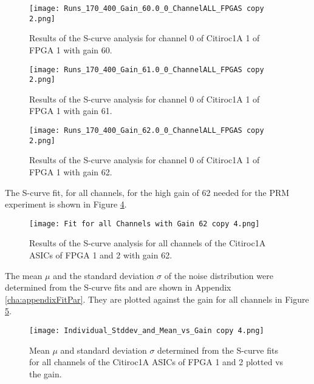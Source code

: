     \begin{figure}[H]
        \centering
        \texttt{[image: Runs\_170\_400\_Gain\_60.0\_0\_ChannelALL\_FPGAS copy 2.png]}
        \caption{Results of the S-curve analysis for channel 0 of Citiroc1A 1 of FPGA 1 with gain 60.}
        \label{fig:S_curve_60}
    \end{figure}
    \begin{figure}[H]
        \centering
        \texttt{[image: Runs\_170\_400\_Gain\_61.0\_0\_ChannelALL\_FPGAS copy 2.png]}
        \caption{Results of the S-curve analysis for channel 0 of Citiroc1A 1 of FPGA 1 with gain 61.}
        \label{fig:S_curve_61}
    \end{figure}
    \begin{figure}[H]
        \centering
        \texttt{[image: Runs\_170\_400\_Gain\_62.0\_0\_ChannelALL\_FPGAS copy 2.png]}
        \caption{Results of the S-curve analysis for channel 0 of Citiroc1A 1 of FPGA 1 with gain 62.}
        \label{fig:S_curve_62}
    \end{figure}
    The S-curve fit, for all channels, for the high gain of 62 needed for the PRM experiment is shown in Figure \ref{fig:S_curve_62_ALL}. 
    
    \begin{figure}[H]
        \centering
        \texttt{[image: Fit for all Channels with Gain 62 copy 4.png]}
        \caption{Results of the S-curve analysis for all channels of the Citiroc1A ASICs of FPGA 1 and 2 with gain 62.}
        \label{fig:S_curve_62_ALL}
    \end{figure}
    The mean $\mu$ and the standard deviation $\sigma$ of the noise distribution were determined from the S-curve fits and are shown in Appendix \ref{cha:appendixFitPar}.
    They are plotted against the gain for all channels in Figure \ref{fig:Mean vs gain}.
    \begin{figure}[H]
        \centering
        \texttt{[image: Individual\_Stddev\_and\_Mean\_vs\_Gain copy 4.png]}
        \caption{Mean $\mu$ and standard deviation $\sigma$ determined from the S-curve fits for all channels of the Citiroc1A ASICs of FPGA 1 and 2 plotted vs the gain.}
        \label{fig:Mean vs gain}
    \end{figure}
    
